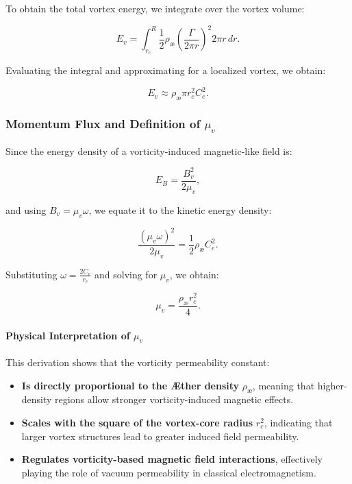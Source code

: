 To obtain the total vortex energy, we integrate over the vortex volume:

\begin{equation*}
    E_v = \int_{r_c}^{R} \frac{1}{2} \rho_{\text{\ae}} \left( \frac{\Gamma}{2\pi r} \right)^2 2\pi r \, dr.
\end{equation*}

Evaluating the integral and approximating for a localized vortex, we obtain:

\begin{equation*}
    E_v \approx \rho_{\text{\ae}} \pi r_c^2 C_e^2.
\end{equation*}

\subsubsection*{Momentum Flux and Definition of \( \mu_v \)}
Since the energy density of a vorticity-induced magnetic-like field is:

\begin{equation*}
    E_B = \frac{B_v^2}{2\mu_v},
\end{equation*}

and using \( B_v = \mu_v \omega \), we equate it to the kinetic energy density:

\begin{equation*}
    \frac{(\mu_v \omega)^2}{2\mu_v} = \frac{1}{2} \rho_{\text{\ae}} C_e^2.
\end{equation*}

Substituting \( \omega = \frac{2C_e}{r_c} \) and solving for \( \mu_v \), we obtain:

\begin{equation*}
    \mu_v = \frac{\rho_{\text{\ae}} r_c^2}{4}.
\end{equation*}

\paragraph*{Physical Interpretation of \( \mu_v \)}
This derivation shows that the vorticity permeability constant:

\begin{itemize}
    \item \textbf{Is directly proportional to the Æther density} \( \rho_{\text{\ae}} \), meaning that higher-density regions allow stronger vorticity-induced magnetic effects.
    \item \textbf{Scales with the square of the vortex-core radius} \( r_c^2 \), indicating that larger vortex structures lead to greater induced field permeability.
    \item \textbf{Regulates vorticity-based magnetic field interactions}, effectively playing the role of vacuum permeability in classical electromagnetism.
\end{itemize}

